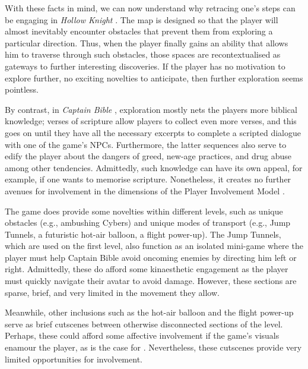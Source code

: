 With these facts in mind, we can now understand why retracing one's steps can be engaging in \textit{Hollow Knight} \parencite{team_cherry_hollow_2017}. The map is designed so that the player will almost inevitably encounter obstacles that prevent them from exploring a particular direction. Thus, when the player finally gains an ability that allows him to traverse through such obstacles, those spaces are recontextualised as gateways to further interesting discoveries. If the player has no motivation to explore further, no exciting novelties to anticipate, then further exploration seems pointless.

By contrast, in \textit{Captain Bible} \parencite{engelbrite_captain_1994}, exploration mostly nets the players more biblical knowledge; verses of scripture allow players to collect even more verses, and this goes on until they have all the necessary excerpts to complete a scripted dialogue with one of the game's \acp{NPC}. Furthermore, the latter sequences also serve to edify the player about the dangers of greed, new-age practices, and drug abuse among other tendencies. Admittedly, such knowledge can have its own appeal, for example, if one wants to memorise scripture. Nonetheless, it creates no further avenues for involvement in the dimensions of the Player Involvement Model \parencite{calleja_in_game_2011}.

The game does provide some novelties within different levels, such as unique obstacles (e.g., ambushing Cybers) and unique modes of transport (e.g., Jump Tunnels, a futuristic hot-air balloon, a flight power-up). The Jump Tunnels, which are used on the first level, also function as an isolated mini-game where the player must help Captain Bible avoid oncoming enemies by directing him left or right. Admittedly, these do afford some kinaesthetic engagement as the player must quickly navigate their avatar to avoid damage. However, these sections are sparse, brief, and very limited in the movement they allow. 

Meanwhile, other inclusions such as the hot-air balloon and the flight power-up serve as brief cutscenes between otherwise disconnected sections of the level. Perhaps, these could afford some affective involvement if the game's visuals enamour the player, as is the case for \textcite{censorious_idler_captain_2018}. Nevertheless, these cutscenes provide very limited opportunities for involvement. 


